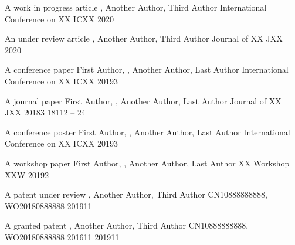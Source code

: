 

{A work in progress article} %
{, Another Author, Third Author}
{International Conference on XX} %
{ICXX} %
{2020} %

{An under review article}
{, Another Author, Third Author}
{Journal of XX} %
{JXX} %
{2020} %

{A conference paper}
{First Author, , Another Author, Last Author}
{International Conference on XX} %
{ICXX} %
{2019}{3} %

{A journal paper}
{First Author, , Another Author, Last Author}
{Journal of XX} %
{JXX} %
{2018}{3} %
{18}{1}{12 -- 24} %

{A conference poster}
{First Author, , Another Author, Last Author}
{International Conference on XX} %
{ICXX} %
{2019}{3} %

{A workshop paper}
{First Author, , Another Author, Last Author}
{XX Workshop} %
{XXW} %
{2019}{2} %

{A patent under review}
{, Another Author, Third Author}
{CN10888888888, WO20180888888} %
{2019}{1}{1} %

{A granted patent}
{, Another Author, Third Author}
{CN10888888888, WO20180888888} %
{2016}{1}{1} %
{2019}{1}{1} %